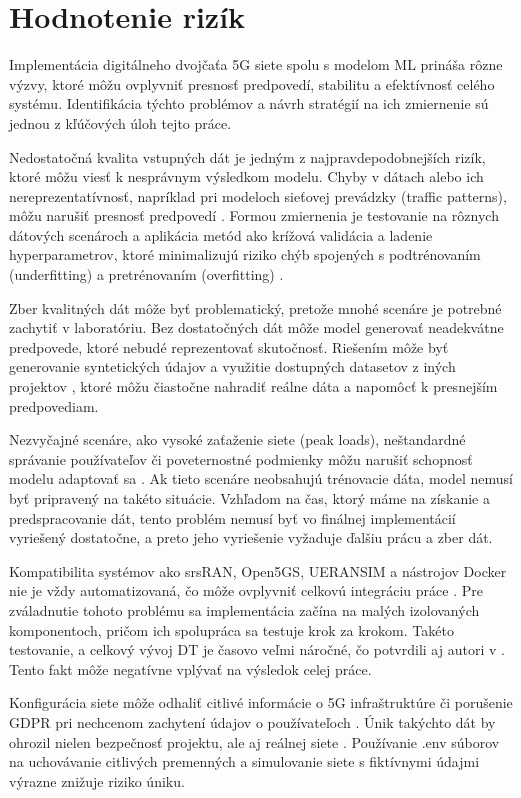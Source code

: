 \section{Hodnotenie rizík}
\par{
Implementácia digitálneho dvojčaťa 5G siete spolu s modelom ML prináša rôzne výzvy, ktoré môžu ovplyvniť presnosť predpovedí, stabilitu a efektívnosť celého systému. Identifikácia týchto problémov a návrh stratégií na ich zmiernenie sú jednou z kľúčových úloh tejto práce.

Nedostatočná kvalita vstupných dát je jedným z najpravdepodobnejších rizík, ktoré môžu viesť k nesprávnym výsledkom modelu. Chyby v dátach alebo ich nereprezentatívnosť, napríklad pri modeloch sieťovej prevádzky (traffic patterns), môžu narušiť presnosť predpovedí \cite{ML_traffic}. Formou zmiernenia je testovanie na rôznych dátových scenároch a aplikácia metód ako krížová validácia a ladenie hyperparametrov, ktoré minimalizujú riziko chýb spojených s podtrénovaním (underfitting) a pretrénovaním (overfitting) \cite{Nguyen}.

Zber kvalitných dát môže byť problematický, pretože mnohé scenáre je potrebné zachytiť v laboratóriu. Bez dostatočných dát môže model generovať neadekvátne predpovede, ktoré nebudé reprezentovať skutočnosť. Riešením môže byť generovanie syntetických údajov \cite{data_generating} a využitie dostupných datasetov z iných projektov \cite{datasets_telecom}, ktoré môžu čiastočne nahradiť reálne dáta a napomôcť k presnejším predpovediam.

Nezvyčajné scenáre, ako vysoké zaťaženie siete (peak loads), neštandardné správanie používateľov či poveternostné podmienky môžu narušiť schopnosť modelu adaptovať sa \cite{challenges_human_factor}. Ak tieto scenáre neobsahujú trénovacie dáta, model nemusí byť pripravený na takéto situácie. Vzhľadom na čas, ktorý máme na získanie a predspracovanie dát, tento problém nemusí byť vo finálnej implementácií vyriešený dostatočne, a preto jeho vyriešenie vyžaduje ďalšiu prácu a zber dát.

Kompatibilita systémov ako srsRAN, Open5GS, UERANSIM a nástrojov Docker nie je vždy automatizovaná, čo môže ovplyvniť celkovú integráciu práce \cite{challenges_human_factor}. Pre zváladnutie tohoto problému sa implementácia začína na malých izolovaných komponentoch, pričom ich spolupráca sa testuje krok za krokom. Takéto testovanie, a celkový vývoj DT je časovo veľmi náročné, čo potvrdili aj autori v \cite{USAirForce}. Tento fakt môže negatívne vplývať na výsledok celej práce.

Konfigurácia siete môže odhaliť citlivé informácie o 5G infraštruktúre či porušenie GDPR \cite{big-data-problems} pri nechcenom zachytení údajov o používateľoch \cite{challenges-technol}. Únik takýchto dát by ohrozil nielen bezpečnosť projektu, ale aj reálnej siete \cite{Dt_Iot_data_worry_about}. Používanie .env súborov na uchovávanie citlivých premenných a simulovanie siete s fiktívnymi údajmi výrazne znižuje riziko úniku.
}

